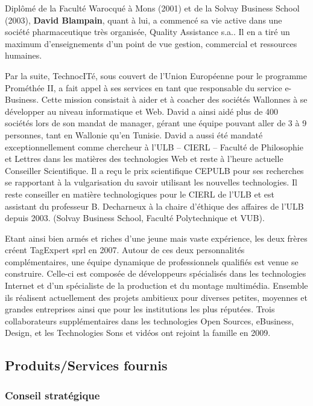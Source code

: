 \documentclass{article}
\begin{document}
\begin{sffamily}
Diplômé de la Faculté Warocqué à Mons (2001) et de la Solvay Business School (2003), \textbf{David Blampain}, quant à lui, a commencé sa vie active dans une société 
pharmaceutique très organisée, Quality Assistance s.a.. Il en a tiré un maximum d’enseignements d’un point de vue gestion, commercial et ressources humaines.

Par la suite, TechnocITé, sous couvert de l’Union Européenne pour le programme Prométhée II, a fait appel à ses services en tant que responsable du service e-Business. Cette 
mission consistait à aider et à coacher des sociétés Wallonnes à se développer au niveau informatique et Web. David a ainsi aidé plus de 400 sociétés lors de son mandat de 
manager, gérant une équipe pouvant aller de 3 à 9 personnes, tant en Wallonie qu’en Tunisie. David a aussi été mandaté exceptionnellement comme chercheur à l’ULB – CIERL – 
Faculté de Philosophie et Lettres dans les matières des technologies Web et reste à l’heure actuelle Conseiller Scientifique. Il a reçu le prix scientifique CEPULB pour ses 
recherches se rapportant à la vulgarisation du savoir utilisant les nouvelles technologies.  Il reste conseiller en matière technologiques pour le CIERL de l’ULB et est 
assistant du professeur B. Decharneux à la chaire d’éthique des affaires de l’ULB depuis 2003. (Solvay Business School, Faculté Polytechnique et VUB).

Etant ainsi bien armés et riches d’une jeune mais vaste expérience, les deux frères créent TagExpert sprl en 2007. Autour de ces deux personnalités complémentaires, une 
équipe dynamique de professionnels qualifiés est venue se construire. Celle-ci est composée de développeurs spécialisés dans les technologies Internet et d’un spécialiste de 
la production et du montage multimédia. Ensemble ils réalisent actuellement des projets ambitieux pour diverses petites, moyennes et grandes entreprises ainsi que pour les 
institutions les plus réputées. Trois collaborateurs supplémentaires dans les technologies Open Sources, eBusiness, Design, et les Technologies Sons et vidéos ont rejoint la 
famille en 2009.

\subsection{Produits/Services fournis}

\subsubsection{Conseil stratégique}


\end{sffamily}
\end{document}
